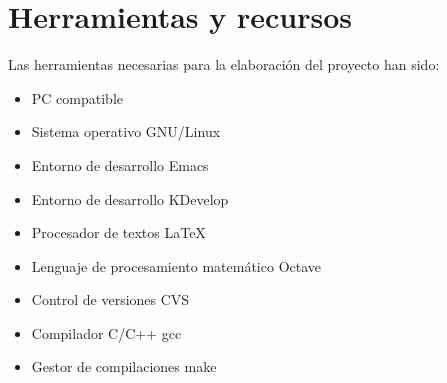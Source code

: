 %

\chapter{Herramientas y recursos}
\label{cha:herr-y-recurs}

Las herramientas necesarias para la elaboración del proyecto han sido:

\begin{itemize}
\item PC compatible 
\item Sistema operativo GNU/Linux \cite{gnulinux}
\item Entorno de desarrollo Emacs \cite{emacs}
\item Entorno de desarrollo KDevelop \cite{kdevelop}
\item Procesador de textos \LaTeX \cite{lamport94}
\item Lenguaje de procesamiento matemático Octave  \cite{octave}
\item Control de versiones CVS \cite{cvs}
\item Compilador C/C++ gcc \cite{gcc}
\item Gestor de compilaciones make \cite{make}
\end{itemize}



